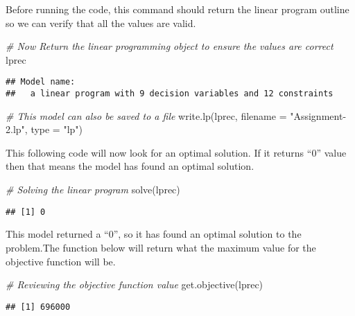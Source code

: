\documentclass[
]{article}
\newenvironment{Shaded}{\begin{snugshade}}{\end{snugshade}}
\newcommand{\AttributeTok}[1]{\textcolor[rgb]{0.77,0.63,0.00}{#1}}
\newcommand{\CommentTok}[1]{\textcolor[rgb]{0.56,0.35,0.01}{\textit{#1}}}
\newcommand{\FunctionTok}[1]{\textcolor[rgb]{0.00,0.00,0.00}{#1}}
\newcommand{\NormalTok}[1]{#1}
\newcommand{\StringTok}[1]{\textcolor[rgb]{0.31,0.60,0.02}{#1}}
\begin{document}
Before running the code, this command should return the linear program
outline so we can verify that all the values are valid.

\begin{Shaded}
\begin{Highlighting}[]
\CommentTok{\# Now Return the linear programming object to ensure the values are correct}
\NormalTok{lprec}
\end{Highlighting}
\end{Shaded}

\begin{verbatim}
## Model name: 
##   a linear program with 9 decision variables and 12 constraints
\end{verbatim}

\begin{Shaded}
\begin{Highlighting}[]
\CommentTok{\# This model can also be saved to a file}
\FunctionTok{write.lp}\NormalTok{(lprec, }\AttributeTok{filename =} \StringTok{"Assignment{-}2.lp"}\NormalTok{, }\AttributeTok{type =} \StringTok{"lp"}\NormalTok{)}
\end{Highlighting}
\end{Shaded}

This following code will now look for an optimal solution. If it returns
``0'' value then that means the model has found an optimal solution.

\begin{Shaded}
\begin{Highlighting}[]
\CommentTok{\# Solving the linear program}
\FunctionTok{solve}\NormalTok{(lprec)}
\end{Highlighting}
\end{Shaded}

\begin{verbatim}
## [1] 0
\end{verbatim}

This model returned a ``0'', so it has found an optimal solution to the
problem.The function below will return what the maximum value for the
objective function will be.

\begin{Shaded}
\begin{Highlighting}[]
\CommentTok{\# Reviewing the objective function value}
\FunctionTok{get.objective}\NormalTok{(lprec)}
\end{Highlighting}
\end{Shaded}

\begin{verbatim}
## [1] 696000
\end{verbatim}
\end{document}
